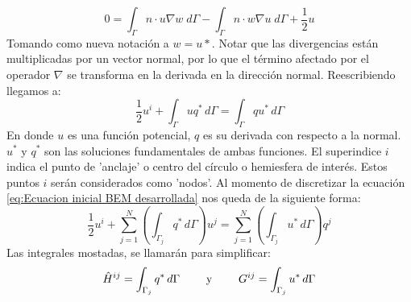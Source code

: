 \begin{equation}
0=\int_\Gamma n\cdot u\nabla w\;d\Gamma-\int_\Gamma n\cdot w\nabla u\;d\Gamma+\frac{1}{2}u
\end{equation}
Tomando como nueva notación a $w=u*$. Notar que las divergencias están multiplicadas por un vector normal, por lo que el término afectado por el operador $\nabla$ se transforma en la derivada en la dirección normal. Reescribiendo llegamos a:
\begin{equation}
\label{eq:Ecuacion inicial BEM desarrollada}
\frac{1}{2}u^i+\int_\Gamma uq^*\,d\Gamma=\int_\Gamma qu^*\,d\Gamma
\end{equation}
En donde $u$ es una función potencial, $q$ es su derivada con respecto a la normal. $u^*$ y $q^*$ son las soluciones fundamentales de ambas funciones. El superindice $i$ indica el punto de 'anclaje' o centro del círculo o hemiesfera de interés.
Estos puntos $i$ serán considerados como 'nodos'. 
Al momento de discretizar la ecuación \eqref{eq:Ecuacion inicial BEM desarrollada} nos queda de la siguiente forma:
\begin{equation}
\label{eq:Ecuacion discretizada}
\frac{1}{2}u^i+\sum_{j=1}^N\left( \int_{\Gamma_j} q^*\,d\Gamma\right)u^j=\sum_{j=1}^N \left(\int_{\Gamma_j} u^*\,d\Gamma \right)q^j
\end{equation}
Las integrales mostadas, se llamarán para simplificar:
\begin{equation}
\label{eq:Descripcion de matriz H y G}
\hat{H}^{ij}=\int_{\Gamma_j}q^*\,d\Gamma\qquad\textnormal{ y }\qquad G^{ij}=\int_{\Gamma_j}u^*\,d\Gamma
\end{equation}	 
